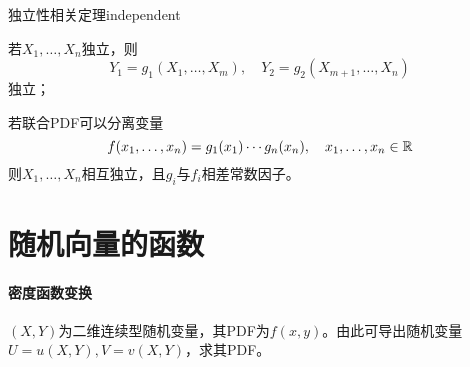 \begin{theorem}{独立性相关定理}{independent}
	\begin{compactenum}
		\item 若$X_1,\ldots,X_n$独立，则
		\[
			Y_1=g_1(X_1,\ldots,X_m),\quad Y_2=g_2(X_{m+1},\ldots,X_n)
		\]
		独立；
		\item 若联合PDF可以分离变量
		\[
			f(x_1,\ldots,x_n)=g_1(x_1)\cdots g_n(x_n),\quad x_1,\ldots,x_n\in\mathbb R
		\]
		则$X_1,\ldots,X_n$相互独立，且$g_i$与$f_i$相差常数因子。
	\end{compactenum}
\end{theorem}
\section{随机向量的函数}
\paragraph{密度函数变换}$(X,Y)$为二维连续型随机变量，其PDF为$f(x,y)$。由此可导出随机变量$U=u(X,Y),V=v(X,Y)$，求其PDF。

